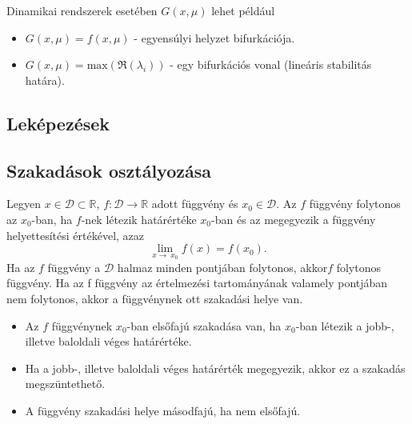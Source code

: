 Dinamikai rendszerek esetében $G(x,\mu)$ lehet például
\begin{itemize}
	\item $G(x,\mu)=f(x,\mu)$ - egyensúlyi helyzet bifurkációja.
	\item $G(x,\mu)=\mathrm{max}(\Re(\lambda_i))$ - egy bifurkációs vonal (lineáris stabilitás határa).
\end{itemize}

\subsection{Leképezések}

\subsection{Szakadások osztályozása}
Legyen $x \in \mathcal{D} \subset \mathbb{R}$, $f: \mathcal{D} \rightarrow \mathbb{R}$ adott függvény és $x_0 \in \mathcal{D}$. Az $f$ függvény folytonos az $x_0$-ban, ha $f$-nek létezik határértéke $x_0$-ban és az megegyezik a függvény helyettesítési értékével, azaz
\[
\lim_{x\to\ x_0 } f(x)=f(x_0).
\]
Ha az $f$ függvény a $\mathcal{D}$ halmaz minden pontjában folytonos, akkor$f$ folytonos függvény.
Ha az f függvény az értelmezési tartományának valamely pontjában nem folytonos, akkor a függvénynek ott szakadási helye van.
\begin{itemize}
	\item Az $ f$ függvénynek $x_0$-ban elsőfajú szakadása van, ha $x_0$-ban létezik a jobb-, illetve baloldali véges határértéke.
	\item Ha a jobb-, illetve baloldali véges határérték megegyezik, akkor ez a szakadás megszüntethető.
	\item A függvény szakadási helye másodfajú, ha nem elsőfajú.
\end{itemize}

\clearpage
